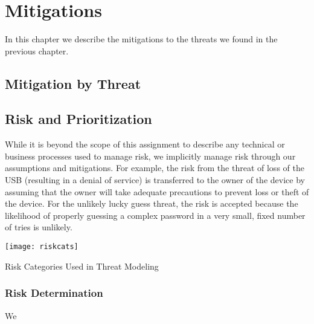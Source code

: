 \chapter{Mitigations}
\label{ch:mitigations}
In this chapter we describe the mitigations to the threats we found in
the previous chapter.

\section{Mitigation by Threat}

\section{Risk and Prioritization}
\label{sec:risk}
While it is beyond the scope of this assignment to describe any technical or business processes used to manage risk, we implicitly manage risk through our assumptions and mitigations.  For example, the risk from the threat of loss of the USB (resulting in a denial of service) is transferred to the owner of the device by assuming that the owner will take adequate precautions to prevent loss or theft of the device.  For the unlikely lucky guess threat, the risk is accepted because the likelihood of properly guessing a complex password in a very small, fixed number of tries is unlikely.

\begin{marginfigure}
    \centering
    \texttt{[image: riskcats]}
    \caption{Risk Categories Used in Threat Modeling}
    \label{fig:riskcats}
\end{marginfigure}


\subsection{Risk Determination}
We
